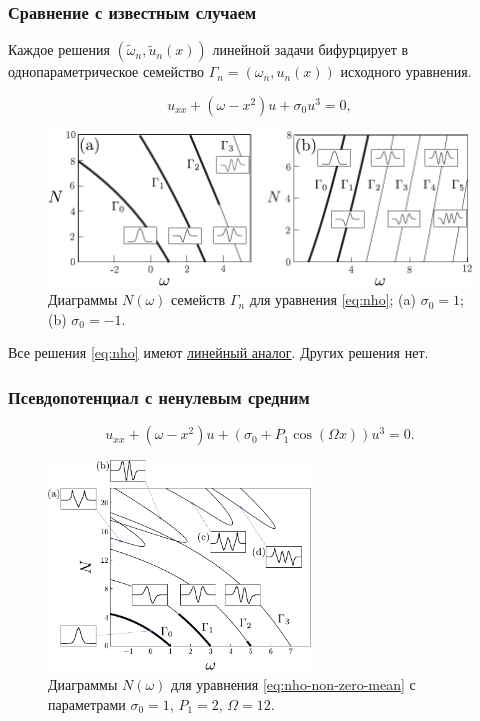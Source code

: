 \documentclass [10pt] {beamer}
\begin{document}
\begin{frame}
	\frametitle{Сравнение с известным случаем}
	
	Каждое решения $(\tilde{\omega}_n, \tilde{u}_n(x))$ линейной задачи бифурцирует в однопараметрическое семейство $\Gamma_n = (\omega_n, u_n(x))$ исходного уравнения.
	
	\begin{equation}
		u_{xx} + (\omega - x^2) u + \sigma_0 u^3 = 0,
	\label{eq:nho}
	\end{equation}
	
	\begin{figure}[h]
	\includegraphics[width = 1\textwidth]{pic/stability for nho with constant pseudopotential}
	\caption{
		Диаграммы $N(\omega)$ семейств $\Gamma_n$ для уравнения \eqref{eq:nho}; (a) $\sigma_0 = 1$; (b) $\sigma_0 = -1$.
	}
	\label{fig:branches-nho}
	\end{figure}
	
	Все решения \eqref{eq:nho} имеют \underline{линейный аналог}.
	Других решения нет.
\end{frame}

\begin{frame}
	\frametitle{Псевдопотенциал с ненулевым средним}
	
	\begin{equation}
		u_{xx} + (\omega - x^2) u + (\sigma_0 + P_1 \cos (\Omega x)) u^3 = 0.
	\label{eq:nho-non-zero-mean}
	\end{equation}
	
	\begin{figure}[h]
	\includegraphics[width = 0.62\textwidth]{pic/branches for cosine nho, case (a)}
	\caption{
		Диаграммы $N(\omega)$ для уравнения \eqref{eq:nho-non-zero-mean} с параметрами $\sigma_0 = 1$, $P_1 = 2$, $\Omega = 12$.
	}
	\end{figure}
\end{frame}
\end{document}
